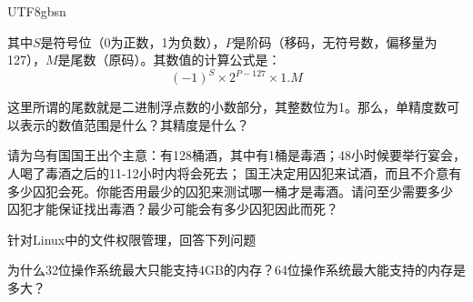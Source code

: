 \documentclass[addpoints,12pt,answers]{exam}
\begin{document}
\begin{CJK*}{UTF8}{gbsn}
\begin{questions}
其中$S$是符号位（0为正数，1为负数），$P$是阶码（移码，无符号数，偏移量为127），$M$是尾数（原码）。其数值的计算公式是：
$$
(-1)^{S} \times 2^{P-127} \times 1.M
$$

这里所谓的尾数就是二进制浮点数的小数部分，其整数位为1。那么，单精度数可以表示的数值范围是什么？其精度是什么？

\begin{solution}
\vspace{2in}

\end{solution}


\question[10]
请为乌有国国王出个主意：有128桶酒，其中有1桶是毒酒；48小时候要举行宴会，人喝了毒酒之后的11-12小时内将会死去；
国王决定用囚犯来试酒，而且不介意有多少囚犯会死。你能否用最少的囚犯来测试哪一桶才是毒酒。请问至少需要多少
囚犯才能保证找出毒酒？最少可能会有多少囚犯因此而死？

\begin{solution}
\vspace{1in}
\end{solution}


\question
针对Linux中的文件权限管理，回答下列问题

\question[10]
为什么32位操作系统最大只能支持4GB的内存？64位操作系统最大能支持的内存是多大？
\begin{solution}
\vspace{1in}
\end{solution}



\end{questions}
\end{CJK*}
\end{document}
